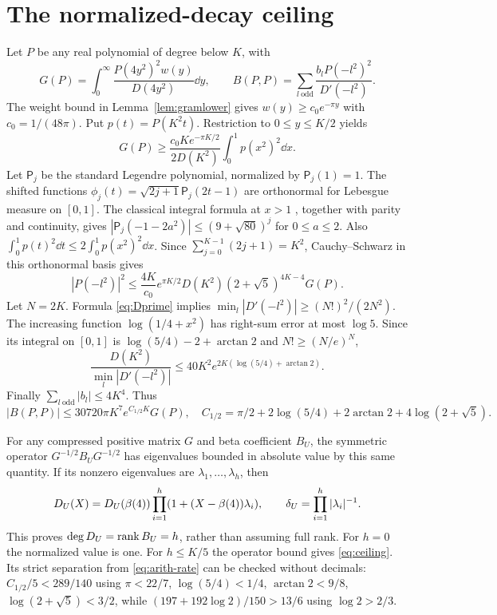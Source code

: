 \section{The normalized-decay ceiling}\label{app:ceiling}
Let $P$ be any real polynomial of degree below $K$, with
\[
 G(P)=\int_0^\infty\frac{P(4y^2)^2w(y)}{D(4y^2)}\dd y,
 \qquad
 B(P,P)=\sum_{l\ \mathrm{odd}}\frac{b_lP(-l^2)^2}{D'(-l^2)}.
\]
The weight bound in Lemma~\ref{lem:gramlower} gives
$w(y)\geq c_0e^{-\pi y}$ with $c_0=1/(48\pi)$.
Put $p(t)=P(K^2t)$. Restriction to $0\leq y\leq K/2$ yields
\[
 G(P)\geq\frac{c_0K e^{-\pi K/2}}{2D(K^2)}
                         \int_0^1p(x^2)^2\dd x.
\]
Let $\mathsf P_j$ be the standard Legendre polynomial, normalized by
$\mathsf P_j(1)=1$. The shifted functions
$\phi_j(t)=\sqrt{2j+1}\mathsf P_j(2t-1)$ are orthonormal for Lebesgue
measure on $[0,1]$. The classical integral formula at $x>1$
\cite[14.12.7]{DLMF}, together with parity and continuity, gives
$|\mathsf P_j(-1-2a^2)|\leq(9+\sqrt{80})^j$ for $0\leq a\leq2$.
Also $\int_0^1p(t)^2\dd t\leq2\int_0^1p(x^2)^2\dd x$.
Since $\sum_{j=0}^{K-1}(2j+1)=K^2$, Cauchy--Schwarz in this
orthonormal basis gives
\[
 |P(-l^2)|^2\leq\frac{4K}{c_0}e^{\pi K/2}D(K^2)
       (2+\sqrt5)^{4K-4}G(P).
\]
Let $N=2K$. Formula \eqref{eq:Dprime} implies
$\min_l|D'(-l^2)|\geq(N!)^2/(2N^2)$. The increasing function
$\log(1/4+x^2)$ has right-sum error at most $\log5$. Since its
integral on $[0,1]$ is $\log(5/4)-2+\arctan2$ and
$N!\geq(N/e)^N$,
\[
 \frac{D(K^2)}{\min_l|D'(-l^2)|}
 \leq40K^2e^{2K(\log(5/4)+\arctan2)}.
\]
Finally $\sum_{l\ \mathrm{odd}}|b_l|\leq4K^4$. Thus
\[
 |B(P,P)|\leq30720\pi K^7e^{C_{1/2}K}G(P),\quad
 C_{1/2}=\pi/2+2\log(5/4)+2\arctan2+4\log(2+\sqrt5).
\]

For any compressed positive matrix $G$ and beta coefficient $B_U$,
the symmetric operator $G^{-1/2}B_UG^{-1/2}$ has eigenvalues bounded
in absolute value by this same quantity. If its nonzero eigenvalues
are $\lambda_1,\ldots,\lambda_h$, then
\[
 D_U(X)=D_U(\beta(4))\prod_{i=1}^h(1+(X-\beta(4))\lambda_i),\qquad
 \delta_U=\prod_{i=1}^h|\lambda_i|^{-1}.
\]
This proves $\deg D_U=\operatorname{rank} B_U=h$, rather than assuming full rank.
For $h=0$ the normalized value is one. For $h\leq K/5$ the operator
bound gives \eqref{eq:ceiling}. Its strict separation from
\eqref{eq:arith-rate} can be checked without decimals:
$C_{1/2}/5<289/140$ using $\pi<22/7$, $\log(5/4)<1/4$,
$\arctan2<9/8$, $\log(2+\sqrt5)<3/2$, while
$(197+192\log2)/150>13/6$ using $\log2>2/3$.

